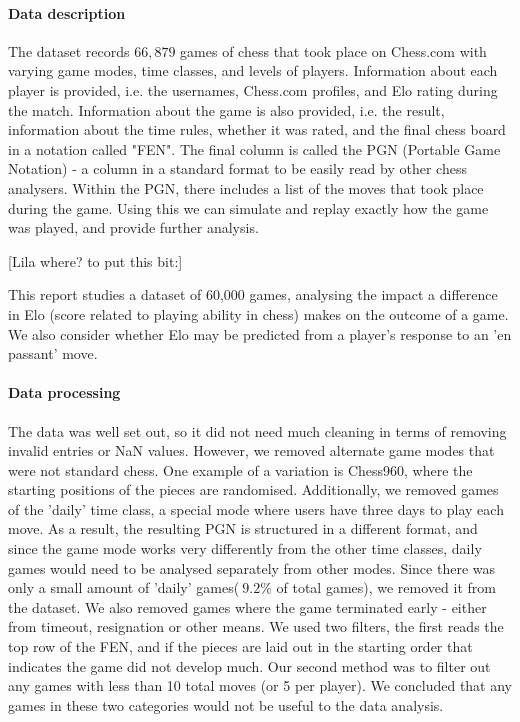 \documentclass[10pt,a4paper]{article}
\begin{document}
\begin{multicols}{2}
\paragraph{Data description}
The dataset records $66,879$ games of chess that took place on Chess.com with varying game modes, time classes, and levels of players. Information about each player is provided, i.e. the usernames, Chess.com profiles, and Elo rating during the match. Information about the game is also provided, i.e. the result, information about the time rules, whether it was rated, and the final chess board in a notation called "FEN". The final column is called the PGN (Portable Game Notation) - a column in a standard format to be easily read by other chess analysers. Within the PGN, there includes a list of the moves that took place during the game. Using this we can simulate and replay exactly how the game was played, and provide further analysis.

[Lila where? to put this bit:]

This report studies a dataset of 60,000 games, analysing the impact a difference in Elo (score related to playing ability in chess) makes on the outcome of a game. We also consider whether Elo may be predicted from a player's response to an 'en passant' move.

\paragraph{Data processing}
The data was well set out, so it did not need much cleaning in terms of removing invalid entries or NaN values. However, we removed alternate game modes that were not standard chess. One example of a variation is Chess960, where the starting positions of the pieces are randomised. Additionally, we removed games of the 'daily' time class, a special mode where users have three days to play each move. As a result, the resulting PGN is structured in a different format, and since the game mode works very differently from the other time classes, daily games would need to be analysed separately from other modes. Since there was only a small amount of 'daily' games($~9.2\%$ of total games), we removed it from the dataset.\newline
We also removed games where the game terminated early - either from timeout, resignation or other means. We used two filters, the first reads the top row of the FEN, and if the pieces are laid out in the starting order that indicates the game did not develop much. Our second method was to filter out any games with less than 10 total moves (or 5 per player). We concluded that any games in these two categories would not be useful to the data analysis.


\end{multicols}
\end{document}
